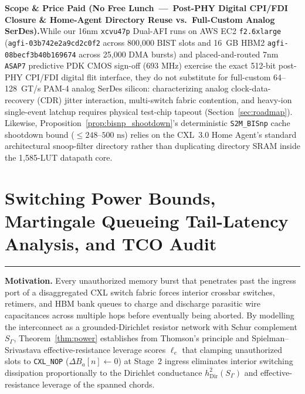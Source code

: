 \documentclass[10pt,twocolumn]{article}
\makeatletter
\newif\ifspecintwocol \specintwocolfalse
\newif\ifspecresume   \specresumefalse
\newcommand{\StopTwoCol}{%
  \if@twocolumn
    \onecolumn
    \global\specintwocolfalse
    \let\spec@next\@empty
  \else
    \ifspecintwocol
      \global\specintwocolfalse
      \def\spec@next{\end{multicols}}%
    \else
      \let\spec@next\@empty
    \fi
  \fi
  \spec@next
}
\newcommand{\BeginConnesPlate}{%
  \if@twocolumn
    \onecolumn
    \global\specresumetrue
    \let\spec@platepre\@empty
  \else
    \ifspecintwocol
      \global\specresumetrue
      \let\spec@platepre\StopTwoCol
    \else
      \global\specresumefalse
      \let\spec@platepre\@empty
    \fi
  \fi
  \spec@platepre
  \par\vspace{4pt}\noindent\textcolor{black!25}{\rule{\textwidth}{0.4pt}}\par\vspace{3pt}%
}
\providecommand{\CoreClbLuts}{1,585}
\providecommand{\CorePhysicalLUTs}{\CoreClbLuts}
\theoremstyle{spectralthm}
\makeatother
\begin{document}
\par\medskip\noindent\textbf{Scope \& Price Paid (No Free Lunch~---~Post-PHY Digital CPI/FDI Closure \& Home-Agent Directory Reuse vs.\ Full-Custom Analog SerDes).}\;While our 16nm \texttt{xcvu47p} Dual-AFI runs on AWS EC2 \texttt{f2.6xlarge} (\texttt{agfi-03b742e2a9cd2c0f2} across 800,000 BIST slots and 16~GB HBM2 \texttt{agfi-08becf3b40b169674} across 25,000 DMA bursts) and placed-and-routed 7nm \texttt{ASAP7} predictive PDK CMOS sign-off ($693\text{~MHz}$) exercise the exact 512-bit post-PHY CPI/FDI digital flit interface, they do not substitute for full-custom 64--128~GT/s PAM-4 analog SerDes silicon: characterizing analog clock-data-recovery (CDR) jitter interaction, multi-switch fabric contention, and heavy-ion single-event latchup requires physical test-chip tapeout (Section~\ref{sec:roadmap}). Likewise, Proposition~\ref{prop:bisnp_shootdown}'s deterministic \texttt{S2M\_BISnp} cache shootdown bound ($\le 248\text{--}500\text{~ns}$) relies on the CXL~3.0 Home Agent's standard architectural snoop-filter directory rather than duplicating directory SRAM inside the \CorePhysicalLUTs-LUT datapath core.

\section{Switching Power Bounds, Martingale Queueing Tail-Latency Analysis, and TCO Audit}
\label{sec:power}

\BeginConnesPlate
\noindent\textbf{Motivation.}\; Every unauthorized memory burst that penetrates past the ingress port of a disaggregated CXL switch fabric forces interior crossbar switches, retimers, and HBM bank queues to charge and discharge parasitic wire capacitances across multiple hops before eventually being aborted. By modelling the interconnect as a grounded-Dirichlet resistor network with Schur complement $S_\Gamma$, Theorem~\ref{thm:power} establishes from Thomson's principle and Spielman--Srivastava effective-resistance leverage scores $\ell_e$ that clamping unauthorized slots to \texttt{CXL\_NOP} ($\Delta B_a[n] \leftarrow 0$) at Stage~2 ingress eliminates interior switching dissipation proportionally to the Dirichlet conductance $h_{\mathrm{Dir}}^2(S_\Gamma)$ and effective-resistance leverage of the spanned chords.
\end{document}

